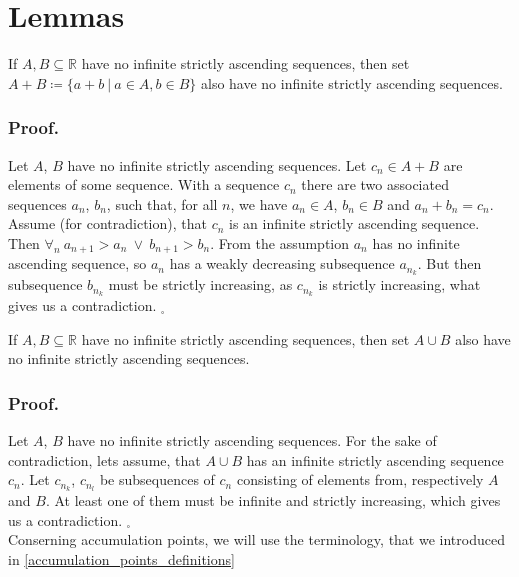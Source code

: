 \section{Lemmas}
\begin{lemma}\label{two_sets_lemma}
If $A, B \subseteq \mathbb{R}$ have no infinite strictly ascending sequences, then set 
$A + B \coloneqq \{a+b\ |\ a \in A, b \in B\}$ also have no infinite strictly ascending sequences. 
\end{lemma}
\noindent\subsubsection{Proof.}
Let $A$, $B$ have no infinite strictly ascending sequences. 
Let $c_n \in A + B$ are elements of some sequence. With a sequence $c_n$ there are 
two associated sequences $a_n$, $b_n$, such that, for all $n$, we have $a_n \in A$, 
$b_n \in B$ and 
$a_n + b_n = c_n$. Assume (for contradiction), that $c_n$ is an infinite strictly 
ascending sequence. 
Then $\forall_n\ a_{n+1}>a_n\ \lor\ b_{n+1} > b_n$. From the assumption $a_n$ has no infinite 
ascending sequence, so $a_n$ has a weakly decreasing subsequence $a_{n_k}$. But then 
subsequence $b_{n_k}$ must be strictly increasing, as $c_{n_k}$ is strictly increasing, what gives 
us a contradiction. 
$_\square$ 

\begin{lemma}\label{sum_lemma}
If $A, B \subseteq \mathbb{R}$ have no infinite strictly ascending sequences, then set 
$A \cup B$ also have no infinite strictly ascending sequences.
\end{lemma}
\subsubsection{Proof.}
Let $A$, $B$ have no infinite strictly ascending sequences. 
For the sake of contradiction, lets assume, that $A \cup B$ has an infinite strictly 
ascending sequence $c_n$. Let $c_{n_k}$, $c_{n_l}$ be subsequences of $c_n$ consisting 
of elements from, respectively $A$ and $B$. At least one of them must be infinite and 
strictly increasing, which gives us a contradiction. $_\square$ \\


Conserning accumulation points, we will use the terminology, that we introduced in 
\ref{accumulation_points_definitions}


